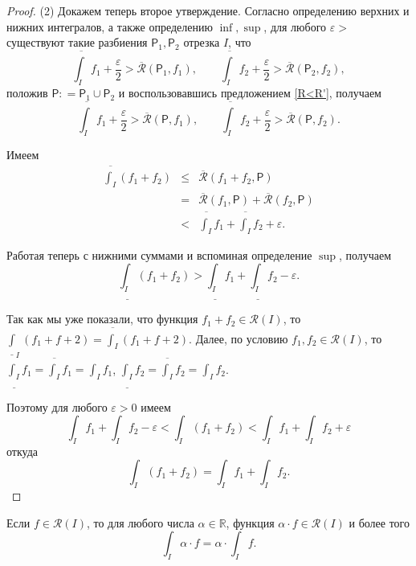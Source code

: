 \begin{proof}
(2) Докажем теперь второе утверждение. Согласно определению верхних и нижних интегралов, а также определению $\inf, \sup$, для любого $\varepsilon>$ существуют такие разбиения $\mathsf{P}_1, \mathsf{P}_2$ отрезка $I$, что
\[
 \overline{\int_I}f_1 + \frac{\varepsilon}{2} > \overline{\mathcal{R}}(\mathsf{P}_1,f_1), \qquad  \overline{\int_I}f_2 + \frac{\varepsilon}{2} > \overline{\mathcal{R}}(\mathsf{P}_2,f_2),
\]
положив $\mathsf{P}: = \mathsf{P}_1 \cup \mathsf{P}_2$ и воспользовавшись предложением \ref{R<R'}, получаем
\[
 \overline{\int_I}f_1 + \frac{\varepsilon}{2} > \overline{\mathcal{R}}(\mathsf{P},f_1), \qquad  \overline{\int_I}f_2 + \frac{\varepsilon}{2} > \overline{\mathcal{R}}(\mathsf{P},f_2).
\]

Имеем
\begin{eqnarray*}
    \overline{\int_I}(f_1 +f_2) &\le& \overline{\mathcal{R}}(f_1 + f_2, \mathsf{P}) \\
    &=& \overline{\mathcal{R}}(f_1, \mathsf{P}) + \overline{\mathcal{R}}(f_2, \mathsf{P}) \\
    &<& \overline{\int_I}f_1 + \overline{\int_I}f_2 + \varepsilon.
\end{eqnarray*}



Работая теперь с нижними суммами и вспоминая определение $\sup$, получаем
\[
 \underline{\int_I}(f_1+f_2) > \underline{\int_I}f_1 + \underline{\int_I}f_2 - \varepsilon.
\]

Так как мы уже показали, что функция $f_1+f_2 \in \mathscr{R}(I)$, то $\underline{\int}_I(f_1+f+2) = \overline{\int_I}(f_1+f+2)$. Далее, по условию $f_1,f_2 \in \mathscr{R}(I)$, то $\underline{\int_I}f_1 = \overline{\int_I}f_1 = \int_I f_1$, $\underline{\int_I}f_2 = \overline{\int_I}f_2 = \int_I f_2$.

Поэтому для любого $\varepsilon>0$ имеем
\[
{\int_I}f_1 + {\int_I}f_2 - \varepsilon < \int_I(f_1+f_2) < {\int_I}f_1 + {\int_I}f_2 + \varepsilon 
\]
откуда
\[
 \int_I(f_1+f_2) = \int_I f_1 + \int_I f_2.
\]
\end{proof}


\begin{theorem}\label{int(af)=a*int(f)}
Если $f\in \mathscr{R}(I)$, то для любого числа $\alpha \in \mathbb{R}$, функция $\alpha\cdot f \in \mathscr{R}(I)$ и более того
\[
 \int_I\alpha\cdot f = \alpha \cdot \int_I f.
\]
\end{theorem}

